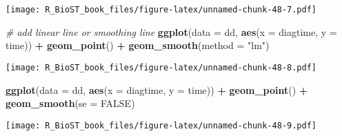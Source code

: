 \documentclass[
]{book}
\newenvironment{Shaded}{\begin{snugshade}}{\end{snugshade}}
\newcommand{\CommentTok}[1]{\textcolor[rgb]{0.56,0.35,0.01}{\textit{#1}}}
\newcommand{\DataTypeTok}[1]{\textcolor[rgb]{0.13,0.29,0.53}{#1}}
\newcommand{\KeywordTok}[1]{\textcolor[rgb]{0.13,0.29,0.53}{\textbf{#1}}}
\newcommand{\NormalTok}[1]{#1}
\newcommand{\OperatorTok}[1]{\textcolor[rgb]{0.81,0.36,0.00}{\textbf{#1}}}
\newcommand{\OtherTok}[1]{\textcolor[rgb]{0.56,0.35,0.01}{#1}}
\newcommand{\StringTok}[1]{\textcolor[rgb]{0.31,0.60,0.02}{#1}}
\begin{document}
\texttt{[image: R\_BioST\_book\_files/figure-latex/unnamed-chunk-48-7.pdf]}

\begin{Shaded}
\begin{Highlighting}[]
\CommentTok{\# add linear line or smoothing line}
\KeywordTok{ggplot}\NormalTok{(}\DataTypeTok{data =}\NormalTok{ dd, }\KeywordTok{aes}\NormalTok{(}\DataTypeTok{x =}\NormalTok{ diagtime, }\DataTypeTok{y =}\NormalTok{ time)) }\OperatorTok{+}\StringTok{ }
\StringTok{  }\KeywordTok{geom\_point}\NormalTok{() }\OperatorTok{+}\StringTok{ }
\StringTok{  }\KeywordTok{geom\_smooth}\NormalTok{(}\DataTypeTok{method =} \StringTok{"lm"}\NormalTok{)}
\end{Highlighting}
\end{Shaded}

\texttt{[image: R\_BioST\_book\_files/figure-latex/unnamed-chunk-48-8.pdf]}

\begin{Shaded}
\begin{Highlighting}[]
\KeywordTok{ggplot}\NormalTok{(}\DataTypeTok{data =}\NormalTok{ dd, }\KeywordTok{aes}\NormalTok{(}\DataTypeTok{x =}\NormalTok{ diagtime, }\DataTypeTok{y =}\NormalTok{ time)) }\OperatorTok{+}\StringTok{ }
\StringTok{  }\KeywordTok{geom\_point}\NormalTok{() }\OperatorTok{+}\StringTok{ }
\StringTok{  }\KeywordTok{geom\_smooth}\NormalTok{(}\DataTypeTok{se =} \OtherTok{FALSE}\NormalTok{)}
\end{Highlighting}
\end{Shaded}

\texttt{[image: R\_BioST\_book\_files/figure-latex/unnamed-chunk-48-9.pdf]}
\end{document}

